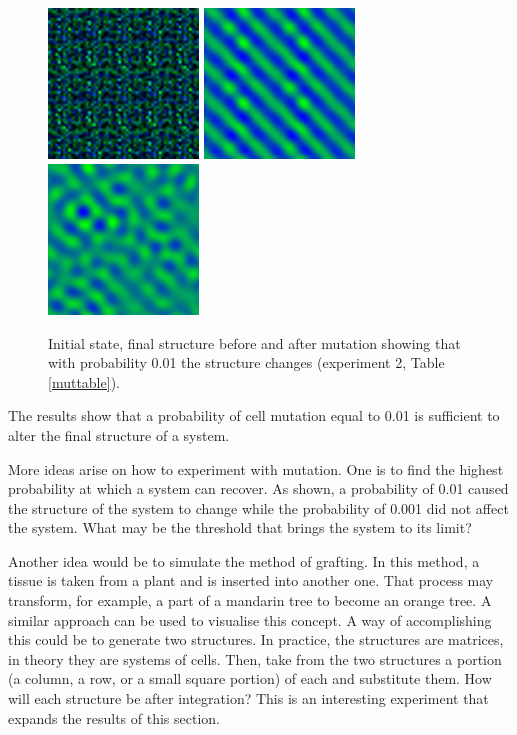 \begin{figure}
\begin{center}
\includegraphics[width=4cm, height=4cm]{st2.png}
\includegraphics[width=4cm, height=4cm]{bm2.png}
\includegraphics[width=4cm, height=4cm]{am2.png}
\end{center}
\caption{Initial state, final structure before and after mutation showing that with probability 0.01 the structure changes (experiment 2, Table \ref{muttable}).}
\label{mut2}
\end{figure}

The results show that a probability of cell mutation equal to 0.01 is sufficient to alter the final structure of a system. 

More ideas arise on how to experiment with mutation. One is to find the highest probability at which a system can recover. As shown, a probability of 0.01 caused the structure of the system to change while the probability of 0.001 did not affect the system. What may be the threshold that brings the system to its limit?

Another idea would be to simulate the method of grafting. In this method, a tissue is taken from a plant and is inserted into another one. That process may transform, for example, a part of a mandarin tree to become an orange tree. A similar approach can be used to visualise this concept. A way of accomplishing this could be to generate two structures. In practice, the structures are matrices, in theory they are systems of cells. Then, take from the two structures a portion (a column, a row, or a small square portion) of each and substitute them. How will each structure be after integration? This is an interesting experiment that expands the results of this section.


